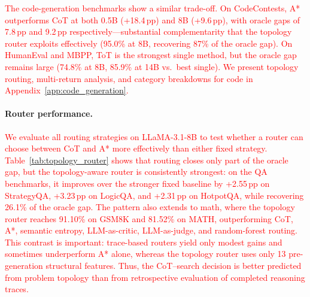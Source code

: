 \documentclass[11pt]{article}
\begin{document}
\textcolor{red}{The code-generation benchmarks show a similar trade-off. On CodeContests, A* outperforms CoT at both 0.5B (+18.4\,pp) and 8B (+9.6\,pp), with oracle gaps of 7.8\,pp and 9.2\,pp respectively---substantial complementarity that the topology router exploits effectively (95.0\% at 8B, recovering 87\% of the oracle gap). On HumanEval and MBPP, ToT is the strongest single method, but the oracle gap remains large (74.8\% at 8B, 85.9\% at 14B vs.\ best single). We present topology routing, multi-return analysis, and category breakdowns for code in Appendix~\ref{app:code_generation}.}




\paragraph{Router performance.}
\textcolor{red}{We evaluate all routing strategies on LLaMA-3.1-8B to test whether a router can choose between CoT and A* more effectively than either fixed strategy. Table~\ref{tab:topology_router} shows that routing closes only part of the oracle gap, but the topology-aware router is consistently strongest: on the QA benchmarks, it improves over the stronger fixed baseline by +2.55\,pp on StrategyQA, +3.23\,pp on LogicQA, and +2.31\,pp on HotpotQA, while recovering 26.1\% of the oracle gap. The pattern also extends to math, where the topology router reaches 91.10\% on GSM8K and 81.52\% on MATH, outperforming CoT, A*, semantic entropy, LLM-as-critic, LLM-as-judge, and random-forest routing. This contrast is important: trace-based routers yield only modest gains and sometimes underperform A* alone, whereas the topology router uses only 13 pre-generation structural features. Thus, the CoT--search decision is better predicted from problem topology than from retrospective evaluation of completed reasoning traces.}
\end{document}
